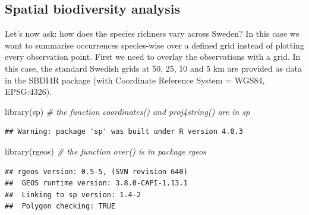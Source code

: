 \documentclass[
  10pt,
]{article}
\newenvironment{Shaded}{\begin{snugshade}}{\end{snugshade}}
\newcommand{\CommentTok}[1]{\textcolor[rgb]{0.56,0.35,0.01}{\textit{#1}}}
\newcommand{\FunctionTok}[1]{\textcolor[rgb]{0.00,0.00,0.00}{#1}}
\newcommand{\NormalTok}[1]{#1}
\begin{document}
\hypertarget{spatial-biodiversity-analysis}{%
\subsection{Spatial biodiversity analysis}\label{spatial-biodiversity-analysis}}

Let's now ask: how does the species richness vary across Sweden? In this case we want to summarise occurrences species-wise over a defined grid instead of plotting every observation point. First we need to overlay the observations with a grid. In this case, the standard Swedish grids at 50, 25, 10 and 5 km are provided as data in the SBDI4R package (with Coordinate Reference System = WGS84, EPSG:4326).

\begin{Shaded}
\begin{Highlighting}[]
\FunctionTok{library}\NormalTok{(sp) }\CommentTok{\# the function coordinates() and proj4string() are in sp}
\end{Highlighting}
\end{Shaded}

\begin{verbatim}
## Warning: package 'sp' was built under R version 4.0.3
\end{verbatim}

\begin{Shaded}
\begin{Highlighting}[]
\FunctionTok{library}\NormalTok{(rgeos) }\CommentTok{\# the function over() is in package rgeos}
\end{Highlighting}
\end{Shaded}

\begin{verbatim}
## rgeos version: 0.5-5, (SVN revision 640)
##  GEOS runtime version: 3.8.0-CAPI-1.13.1 
##  Linking to sp version: 1.4-2 
##  Polygon checking: TRUE
\end{verbatim}
\end{document}
